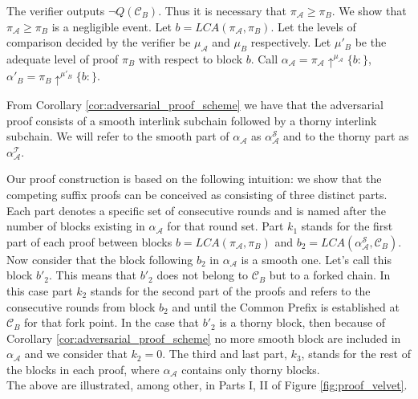 The verifier outputs $\neg Q(\mathcal{C}_B)$. Thus it is necessary that $\pi_\mathcal{A} \geq \pi_B$.
We show that $\pi_\mathcal{A} \geq \pi_B$ is a negligible event.
Let $b = LCA(\pi_\mathcal{A}, \pi_B)$. Let the levels of comparison decided by the verifier
be $\mu_\mathcal{A}$ and $\mu_B$ respectively. Let $\mu'_B$ be the adequate level of proof
$\pi_B$  with respect to block $b$. Call $\alpha_\mathcal{A} = \pi_\mathcal{A} \uparrow^{\mu_\mathcal{A}}\{b:\}$,
$\alpha'_B = \pi_B \uparrow^{\mu'_B}\{b:\}$.

From Corollary \ref{cor:adversarial_proof_scheme} we have that the adversarial proof 
consists of a smooth interlink subchain followed by a thorny interlink subchain. We will refer to the smooth part of $\alpha_\mathcal{A}$ as $\alpha^{\mathcal{S}}_\mathcal{A}$ and to the thorny part as $\alpha^{\mathcal{T}}_\mathcal{A}$.   

Our proof construction is based on the following intuition: we show that the competing
suffix proofs can be conceived as consisting of three distinct parts. Each part denotes a specific set of consecutive rounds and is named after the number of blocks existing
in $\alpha_\mathcal{A}$ for that round set. Part $k_1$ stands for the first part of each proof
between blocks $b = LCA(\pi_\mathcal{A}, \pi_B)$ and $b_2 = LCA(\alpha^{\mathcal{S}}_\mathcal{A}, \mathcal{C}_B)$. Now consider that the block following $b_2$ in $\alpha_\mathcal{A}$ is a smooth one. Let's call this block $b'_2$. This means that $b'_2$ does not belong to $\mathcal{C}_B$ but to a forked chain. In this case part $k_2$ stands for the second part of the proofs and refers to the consecutive rounds from block $b_2$ and until
the Common Prefix is established at $\mathcal{C}_B$ for that fork point. In the case that $b'_2$ is a thorny block, then because of Corollary \ref{cor:adversarial_proof_scheme} no more smooth block are included in $\alpha_\mathcal{A}$ and we consider that $k_2 = 0$.
The third and last part, $k_3$, stands for the rest of the blocks in each proof, where $\alpha_\mathcal{A}$ contains only thorny blocks.\\
The above are illustrated, among other, in Parts I, II of Figure \ref{fig:proof_velvet}.

